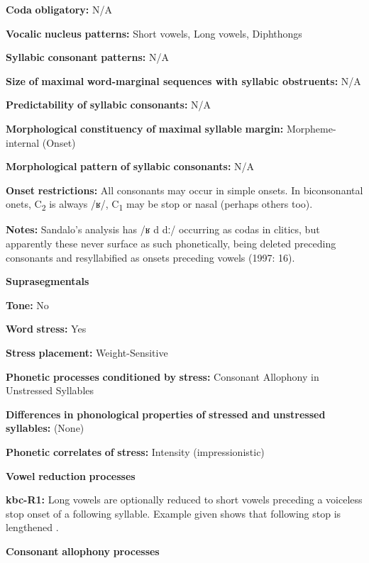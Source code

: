 \textbf{Coda} \textbf{obligatory:} N/A

\textbf{Vocalic} \textbf{nucleus} \textbf{patterns:} Short vowels, Long vowels, Diphthongs

\textbf{Syllabic} \textbf{consonant} \textbf{patterns:} N/A

\textbf{Size} \textbf{of} \textbf{maximal} \textbf{word{}-marginal sequences with syllabic obstruents:} N/A

\textbf{Predictability} \textbf{of} \textbf{syllabic} \textbf{consonants:} N/A

\textbf{Morphological} \textbf{constituency} \textbf{of} \textbf{maximal} \textbf{syllable} \textbf{margin:} Morpheme-internal (Onset)

\textbf{Morphological} \textbf{pattern} \textbf{of} \textbf{syllabic} \textbf{consonants:} N/A

\textbf{Onset} \textbf{restrictions:} All consonants may occur in simple onsets. In biconsonantal onets, C\textsubscript{2} is always /ʁ/, C\textsubscript{1} may be stop or nasal (perhaps others too).

\textbf{Notes:} Sandalo’s analysis has /ʁ d dː/ occurring as codas in clitics, but apparently these never surface as such phonetically, being deleted preceding consonants and resyllabified as onsets preceding vowels (1997: 16).

\textbf{Suprasegmentals}

\textbf{Tone:} No

\textbf{Word} \textbf{stress:} Yes

\textbf{Stress} \textbf{placement:} Weight-Sensitive

\textbf{Phonetic} \textbf{processes} \textbf{conditioned} \textbf{by} \textbf{stress:} Consonant Allophony in Unstressed Syllables

\textbf{Differences} \textbf{in} \textbf{phonological} \textbf{properties} \textbf{of} \textbf{stressed} \textbf{and} \textbf{unstressed} \textbf{syllables:} (None)

\textbf{Phonetic} \textbf{correlates} \textbf{of} \textbf{stress:} Intensity (impressionistic)

\textbf{Vowel} \textbf{reduction} \textbf{processes}

\textbf{kbc-R1:} Long vowels are optionally reduced to short vowels preceding a voiceless stop onset of a following syllable. Example given shows that following stop is lengthened \citep[17]{Sandalo1997}.

\textbf{Consonant} \textbf{allophony} \textbf{processes}

